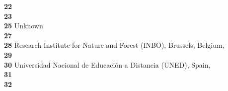 \textbf{22} \\
\textbf{23} \\
\textbf{25} Unknown\\
\textbf{27} \\
\textbf{28} Research Institute for Nature and Forest (INBO), Brussels, Belgium, \\
\textbf{29} \\
\textbf{30} Universidad Nacional de Educación a Distancia (UNED), Spain, \\
\textbf{31} \\
\textbf{32} \\
